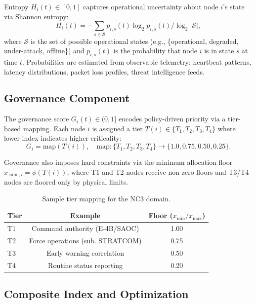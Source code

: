 \documentclass[runningheads]{llncs}
\begin{document}
Entropy $H_i(t) \in [0,1]$ captures operational uncertainty about node $i$'s state via Shannon entropy:
\begin{equation}
H_i(t) = -\sum_{s \in \mathcal{S}} p_{i,s}(t) \log_2 p_{i,s}(t) / \log_2 |\mathcal{S}|,
\end{equation}
where $\mathcal{S}$ is the set of possible operational states (e.g., \{operational, degraded, under-attack, offline\}) and $p_{i,s}(t)$ is the probability that node $i$ is in state $s$ at time $t$. Probabilities are estimated from observable telemetry: heartbeat patterns, latency distributions, packet loss profiles, threat intelligence feeds.

\subsection{Governance Component}

The governance score $G_i(t) \in (0, 1]$ encodes policy-driven priority via a tier-based mapping. Each node $i$ is assigned a tier $T(i) \in \{T_1, T_2, T_3, T_4\}$ where lower index indicates higher criticality:
\begin{equation}
G_i = \text{map}(T(i)), \quad \text{map}: \{T_1, T_2, T_3, T_4\} \to \{1.0, 0.75, 0.50, 0.25\}.
\end{equation}

Governance also imposes hard constraints via the minimum allocation floor $x_{\min,i} = \phi(T(i))$, where T1 and T2 nodes receive non-zero floors and T3/T4 nodes are floored only by physical limits.

\begin{table}[ht]
\caption{Sample tier mapping for the NC3 domain.}
\label{tab:tier_nc3}
\centering
\small
\begin{tabular}{lcc}
\toprule
Tier & Example & Floor ($x_{\min}/x_{\max}$) \\
\midrule
T1 & Command authority (E-4B/SAOC) & 1.00 \\
T2 & Force operations (sub. STRATCOM) & 0.75 \\
T3 & Early warning correlation & 0.50 \\
T4 & Routine status reporting & 0.20 \\
\bottomrule
\end{tabular}
\end{table}

\subsection{Composite Index and Optimization}
\end{document}
